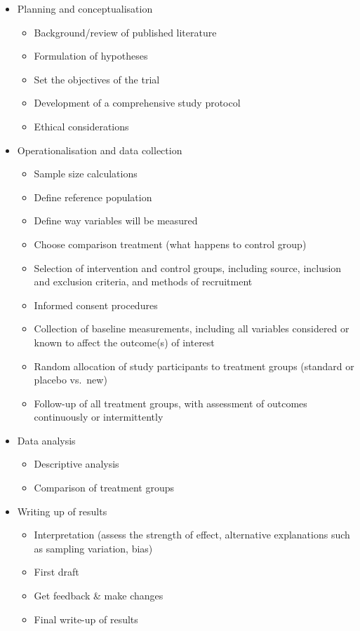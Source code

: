 \documentclass[]{book}
\providecommand{\tightlist}{%
  \setlength{\itemsep}{0pt}\setlength{\parskip}{0pt}}
\theoremstyle{definition}
\theoremstyle{definition}
\theoremstyle{definition}
\theoremstyle{remark}
\begin{document}
\begin{itemize}
\tightlist
\item
  Planning and conceptualisation

  \begin{itemize}
  \tightlist
  \item
    Background/review of published literature
  \item
    Formulation of hypotheses
  \item
    Set the objectives of the trial
  \item
    Development of a comprehensive study protocol
  \item
    Ethical considerations
  \end{itemize}
\item
  Operationalisation and data collection

  \begin{itemize}
  \tightlist
  \item
    Sample size calculations
  \item
    Define reference population
  \item
    Define way variables will be measured
  \item
    Choose comparison treatment (what happens to control group)
  \item
    Selection of intervention and control groups, including source,
    inclusion and exclusion criteria, and methods of recruitment
  \item
    Informed consent procedures
  \item
    Collection of baseline measurements, including all variables
    considered or known to affect the outcome(s) of interest
  \item
    Random allocation of study participants to treatment groups
    (standard or placebo vs.~new)
  \item
    Follow-up of all treatment groups, with assessment of outcomes
    continuously or intermittently
  \end{itemize}
\item
  Data analysis

  \begin{itemize}
  \tightlist
  \item
    Descriptive analysis
  \item
    Comparison of treatment groups
  \end{itemize}
\item
  Writing up of results

  \begin{itemize}
  \tightlist
  \item
    Interpretation (assess the strength of effect, alternative
    explanations such as sampling variation, bias)
  \item
    First draft
  \item
    Get feedback \& make changes
  \item
    Final write-up of results
  \end{itemize}
\end{itemize}
\end{document}
